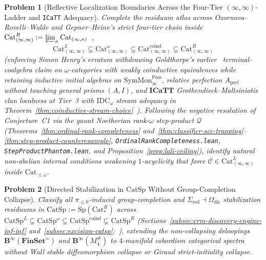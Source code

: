 \documentclass[10pt,twoside,openright]{book}
\theoremstyle{crmplain}
\newtheorem{problem}{Problem}[chapter]
\theoremstyle{crmdef}
\theoremstyle{crmremark}
\begin{document}
\begin{problem}[Reflective Localization Boundaries Across the Four-Tier $(\infty, \infty)$-Ladder and \texttt{ICaTT} Adequacy]\label{prob:open-11}
Complete the residuum atlas across Ozornova--Rovelli--Walde and Gepner--Heine's strict four-tier chain inside $\mathrm{Cat}^R_{(\infty, \infty)} := \varprojlim_\kappa \mathrm{Cat}_{(\infty, n)}$~\cite{ORW26,GepnerHeine26},
\[
  \mathrm{Cat}^L_{(\infty, \infty)} \subsetneq \mathrm{Cat}^\omega_{(\infty, \infty)} \subsetneq \mathrm{Cat}^{\mathrm{coind}}_{(\infty, \infty)} \subsetneq \mathrm{Cat}^R_{(\infty, \infty)}
\]
(enforcing Simon Henry's erratum withdrawing Goldthorpe's earlier~\cite{Goldthorpe23} terminal-coalgebra claim on $\omega$-categories with weakly coinductive equivalences while retaining inductive initial algebras on $\mathrm{SymMon}^{\mathrm{Pres}}_\infty$, relative perfection $A_{\mathrm{perf}}$~\cite{Joyal85,BhattScholze22} without touching general prisms $(A, I)$, and $\mathbf{ICaTT}$ Grothendieck--Maltsiniotis clan localness at Tier~3 with $\mathrm{IDC}_\omega$ stream adequacy in Theorem~\ref{thm:coinductive-stream-choice}~\cite{BCM26,FinsterMimram17}). Following the negative resolution of Conjecture~C1 via the gaunt Noetherian rank-$\omega$ step-product $\mathcal{Q}$ (Theorems~\ref{thm:ordinal-rank-completeness} and~\ref{thm:classifier-scc-trapping}--\ref{thm:step-product-counterexample}, \texttt{OrdinalRankCompleteness.lean}, \texttt{StepProductPhantom.lean}, and Proposition~\ref{prop:lali-ceiling}), identify natural non-abelian internal conditions weakening $1$-acyclicity that force $\mathcal{C} \in \mathrm{Cat}^L_{(\infty, \infty)}$ inside $\mathrm{Cat}_{\le \omega}$.
\end{problem}

\begin{problem}[Directed Stabilization in $\mathrm{CatSp}$ Without Group-Completion Collapse]\label{prob:open-12}
Classify all $\pi_{\le 0}$-induced group-completion and $\Sigma_{\mathrm{red}} \dashv \Omega_{\mathrm{dir}}$ stabilization residuums in $\mathrm{CatSp} := \mathrm{Sp}(\mathrm{Cat}^R_*)$ across $\mathrm{CatSp}^L \subsetneq \mathrm{CatSp}^\omega \subsetneq \mathrm{CatSp}^{\mathrm{coind}} \subsetneq \mathrm{CatSp}^R$ (Sections~\ref{subsec:crm-discovery-engine-inf-inf} and~\ref{subsec:excision-catsp};~\cite{Masuda26,Heine26,Geiss26}), extending the non-collapsing deloopings $\mathbf{B}^\infty(\mathbf{FinSet}^{\simeq})$ and $\mathbf{B}^\infty(M_4^\#)$ to $4$-manifold cobordism categorical spectra without Wall stable diffeomorphism collapse or Giraud strict-initiality collapse.
\end{problem}
\end{document}
